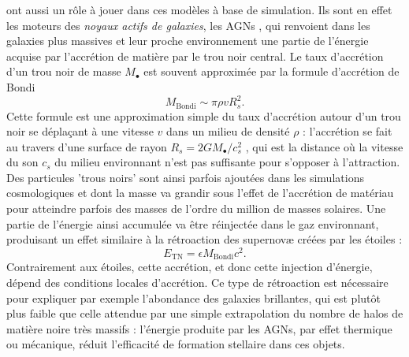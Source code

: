  ont aussi un rôle à jouer dans ces modèles à base de simulation. Ils sont en effet les moteurs des \textit{noyaux actifs de galaxies}, les AGNs , qui renvoient dans les galaxies plus massives et leur proche environnement une partie de l'énergie acquise par l'accrétion de matière par le trou noir central. Le taux d'accrétion d'un trou noir de masse $M_\bullet$ est souvent approximée par la formule d'accrétion de Bondi
\begin{equation}
M_\mathrm{Bondi}\sim \pi \rho v R_s^2.
\end{equation}
Cette formule est une approximation simple du taux d'accrétion autour d'un trou noir se déplaçant à une vitesse $v$ dans un milieu de densité $\rho$ : l'accrétion se fait au travers d'une surface de rayon $R_s=2GM_\bullet/c_s^2$ , qui est la distance où la vitesse du son $c_s$ du milieu environnant n'est pas suffisante pour s'opposer à l'attraction. Des particules 'trous noirs' sont ainsi parfois ajoutées dans les simulations cosmologiques et dont la masse va grandir sous l'effet de l'accrétion de matériau pour atteindre parfois des masses de l'ordre du million de masses solaires. Une partie de l'énergie ainsi accumulée va être réinjectée dans le gaz environnant, produisant un effet similaire à la rétroaction des supernovæ créées par les étoiles :
\begin{equation}
E_{\mathrm{TN}}=\epsilon M_\mathrm{Bondi} c^2.
\end{equation}
Contrairement aux étoiles, cette accrétion, et donc cette injection d'énergie, dépend des conditions locales d'accrétion. Ce type de rétroaction est nécessaire pour expliquer par exemple l'abondance des galaxies brillantes, qui est plutôt plus faible que celle attendue par une simple extrapolation du nombre de halos de matière noire très massifs : l'énergie produite par les AGNs, par effet thermique ou mécanique, réduit l'efficacité de formation stellaire dans ces objets.

